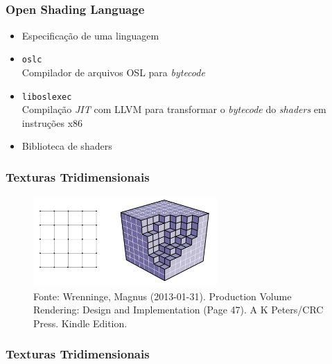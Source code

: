 \documentclass{beamer}
\begin{document}
\subsection{}
\begin{frame}
\frametitle{Open Shading Language}
\begin{itemize}
\item Especificação de uma linguagem
\item \texttt{oslc} \\ Compilador de arquivos OSL para \emph{bytecode}
\item \texttt{liboslexec} \\ Compilação {\it JIT} com LLVM para transformar o \emph{bytecode} do {\it shaders} em instruções x86
\item Biblioteca de shaders
\end{itemize}
\end{frame}


\begin{frame}

\frametitle{Texturas Tridimensionais}

\begin{figure}[!htb]
\center
\includegraphics[width=7cm]{grid_example}
\caption*{\tiny Fonte: Wrenninge, Magnus (2013-01-31). Production Volume Rendering: Design and Implementation (Page 47). A K Peters/CRC Press. Kindle Edition.}
\end{figure}

\end{frame}

\begin{frame}

\frametitle{Texturas Tridimensionais}



\end{frame}
\end{document}
